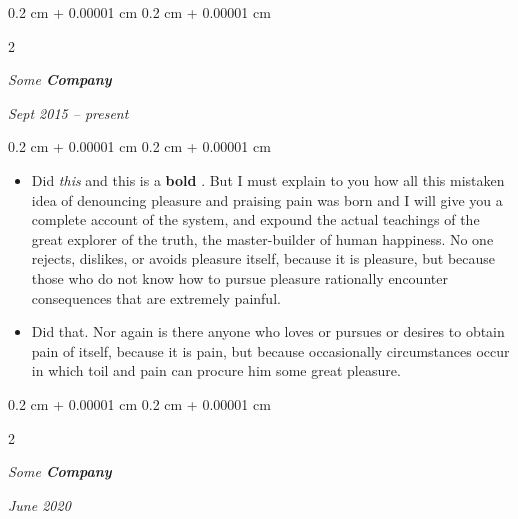 \documentclass[10pt, letterpaper]{article}
\newenvironment{highlights}{
    \begin{itemize}[
        topsep=0.10 cm,
        parsep=0.10 cm,
        partopsep=0pt,
        itemsep=0pt,
        leftmargin=0.4 cm + 10pt
    ]
}{
    \end{itemize}
} %
\newenvironment{onecolentry}{
    \begin{adjustwidth}{
        0.2 cm + 0.00001 cm
    }{
        0.2 cm + 0.00001 cm
    }
}{
    \end{adjustwidth}
} %
\newenvironment{twocolentry}[2][]{
    \onecolentry
    \def\secondColumn{#2}
    \setcolumnwidth{\fill, 4.5 cm}
    \begin{paracol}{2}
}{
    \switchcolumn \raggedleft \secondColumn
    \end{paracol}
    \endonecolentry
} %
\let\hrefWithoutArrow\href
\renewcommand{\href}[2]{\hrefWithoutArrow{#1}{\ifthenelse{\equal{#2}{}}{ }{#2 }\raisebox{.15ex}{\footnotesize \faExternalLink*}}}
\begin{document}
        \vspace{0.2 cm}

            \begin{twocolentry}{


        \textit{Sept 2015 – present}    }
                \textbf{}

                \textit{Some \textbf{Company}}
            \end{twocolentry}

        \vspace{0.10 cm}
        \begin{onecolentry}
            \begin{highlights}
                \item Did \textit{this} and this is a \textbf{bold} \href{https://example.com}{link}. But I must explain to you how all this mistaken idea of denouncing pleasure and praising pain was born and I will give you a complete account of the system, and expound the actual teachings of the great explorer of the truth, the master-builder of human happiness. No one rejects, dislikes, or avoids pleasure itself, because it is pleasure, but because those who do not know how to pursue pleasure rationally encounter consequences that are extremely painful.
                \item Did that. Nor again is there anyone who loves or pursues or desires to obtain pain of itself, because it is pain, but because occasionally circumstances occur in which toil and pain can procure him some great pleasure.
            \end{highlights}
        \end{onecolentry}


        \vspace{0.2 cm}

            \begin{twocolentry}{


        \textit{June 2020}    }
                \textbf{}

                \textit{Some \textbf{Company}}
            \end{twocolentry}
\end{document}
